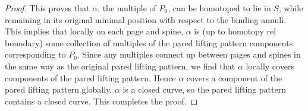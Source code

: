 \begin{proof}
This proves that $\alpha$, the multiple of $P_0$, can be homotoped to lie in
$S$, while remaining in its original minimal position with respect to the
binding annuli.  This implies that locally on each page and spine, $\alpha$ is
(up to homotopy rel boundary) some collection of multiples of the pared lifting
pattern components corresponding to $P_0$. Since any multiples connect up
between pages and spines in the same way as the original pared lifting pattern,
we find that $\alpha$ locally covers components of the pared lifting pattern.
Hence $\alpha$ covers a component of the pared lifting pattern globally.
$\alpha$ is a closed curve, so the pared lifting pattern contains a closed
curve. This completes the proof.

\end{proof}
